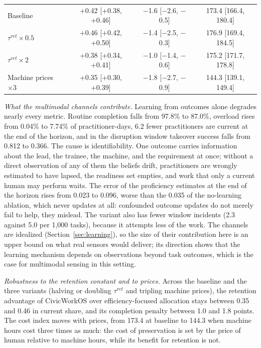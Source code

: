 \documentclass[utf8]{FrontiersinHarvard}
\begin{document}
\begin{table}[!htbp]
\begin{tabularx}{\textwidth}{@{}Xccc@{}}
\midrule
Baseline & +0.42 [+0.38, +0.46] & $-$1.6 [$-$2.6, $-$0.5] & 173.4 [166.4, 180.4]\\
$\tau^{ret}\times0.5$ & +0.46 [+0.42, +0.50] & $-$1.4 [$-$2.5, $-$0.3] & 176.9 [169.4, 184.5]\\
$\tau^{ret}\times2$ & +0.38 [+0.34, +0.41] & $-$1.0 [$-$1.4, $-$0.6] & 175.2 [171.7, 178.8]\\
Machine prices $\times3$ & +0.35 [+0.30, +0.39] & $-$1.8 [$-$2.7, $-$0.9] & 144.3 [139.1, 149.4]\\
			\bottomrule
		\end{tabularx}
	\end{table}

	\textit{What the multimodal channels contribute.} Learning from outcomes alone degrades nearly every metric. Routine completion falls from 97.8\% to 87.0\%, overload rises from 0.04\% to 7.74\% of practitioner-days, 6.2 fewer practitioners are current at the end of the horizon, and in the disruption window takeover success falls from 0.812 to 0.366. The cause is identifiability. One outcome carries information about the lead, the trainee, the machine, and the requirement at once; without a direct observation of any of them the beliefs drift, practitioners are wrongly estimated to have lapsed, the readiness set empties, and work that only a current human may perform waits. The error of the proficiency estimates at the end of the horizon rises from 0.023 to 0.096, worse than the 0.035 of the no-learning ablation, which never updates at all: confounded outcome updates do not merely fail to help, they mislead. The variant also has fewer window incidents (2.3 against 5.0 per 1,000 tasks), because it attempts less of the work. The channels are idealized (Section~\ref{sec:learning}), so the size of their contribution here is an upper bound on what real sensors would deliver; its direction shows that the learning mechanism depends on observations beyond task outcomes, which is the case for multimodal sensing in this setting.

	\textit{Robustness to the retention constant and to prices.} Across the baseline and the three variants (halving or doubling $\tau^{ret}$ and tripling machine prices), the retention advantage of CivicWorkOS over efficiency-focused allocation stays between 0.35 and 0.46 in current share, and its completion penalty between 1.0 and 1.8 points. The cost index moves with prices, from 173.4 at baseline to 144.3 when machine hours cost three times as much: the cost of preservation is set by the price of human relative to machine hours, while its benefit for retention is not.
\end{document}
